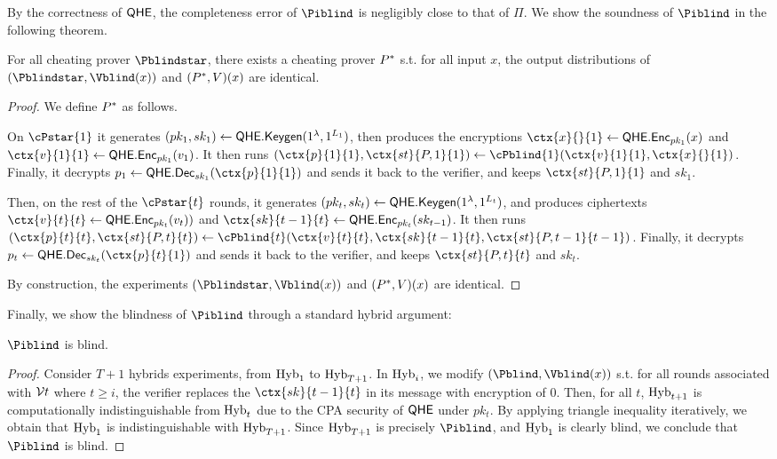By the correctness of $\mathsf{QHE}$, the completeness error of $\Piblind$ is negligibly close to that of $\Pi$.
We show the soundness of $\Piblind$ in the following theorem.

\begin{theorem}
	For all cheating prover $\Pblindstar$, there exists a cheating prover $P^*$ s.t. for all input $x$, the output distributions of $(\Pblindstar, \Vblind(x))$ and $(P^*, V)(x)$ are identical.
\end{theorem}
\begin{proof}
	We define $P^*$ as follows.
	
	On $\cPstar{1}$ it generates
	$(pk_1, sk_1)\leftarrow\mathsf{QHE.Keygen}(1^\lambda, 1^{L_1})$, then produces the encryptions
	$\ctx{x}{}{1}\leftarrow\QEnc_{pk_1}(x)$ and $\ctx{v}{1}{1}\leftarrow\QEnc_{pk_1}(v_1)$.
	It then runs $(\ctx{p}{1}{1}, \ctx{st}{P, 1}{1})\leftarrow\cPblind{1}(\ctx{v}{1}{1}, \ctx{x}{}{1})$.
	Finally, it decrypts $p_1\leftarrow\QDec_{sk_1}(\ctx{p}{1}{1})$ and sends it back to the verifier,
	and keeps $\ctx{st}{P, 1}{1}$ and $sk_1$.

	Then, on the rest of the $\cPstar{t}$ rounds, it generates
	$(pk_t, sk_t)\leftarrow\mathsf{QHE.Keygen}(1^\lambda, 1^{L_t})$, and produces ciphertexts
	$\ctx{v}{t}{t}\leftarrow\QEnc_{pk_t}(v_t))$ and $\ctx{sk}{t-1}{t}\leftarrow\QEnc_{pk_t}(sk_{t-1})$.
	It then runs $(\ctx{p}{t}{t}, \ctx{st}{P, t}{t})\leftarrow\cPblind{t}(\ctx{v}{t}{t}, \ctx{sk}{t-1}{t}, \ctx{st}{P, t-1}{t-1})$.
	Finally, it decrypts $p_t\leftarrow\QDec_{sk_t}(\ctx{p}{t}{1})$ and sends it back to the verifier,
	and keeps $\ctx{st}{P, t}{t}$ and $sk_t$.
		
	By construction, the experiments $(\Pblindstar, \Vblind(x))$ and $(P^*, V)(x)$ are identical.
\end{proof}

Finally, we show the blindness of $\Piblind$ through a standard hybrid argument:
\begin{theorem}
	$\Piblind$ is blind.
\end{theorem}
\begin{proof}
	Consider $T+1$ hybrids experiments, from $\operatorname{Hyb}_1$ to $\operatorname{Hyb}_{T+1}$.
	In $\operatorname{Hyb}_i$, we modify $(\Pblind, \Vblind(x))$ s.t.
	for all rounds associated with $\mathcal{V}{t}$ where $t\geq i$, the verifier replaces the $\ctx{sk}{t-1}{t}$ in its message with encryption of $0$.
	Then, for all $t$, $\operatorname{Hyb}_{t+1}$ is computationally indistinguishable from $\operatorname{Hyb}_t$ due to the CPA security of $\mathsf{QHE}$ under $pk_t$.
	By applying triangle inequality iteratively, we obtain that $\operatorname{Hyb}_1$ is indistinguishable with $\operatorname{Hyb}_{T+1}$.
	Since $\operatorname{Hyb}_{T+1}$ is precisely $\Piblind$, and $\operatorname{Hyb}_1$ is clearly blind, we conclude that $\Piblind$ is blind.
\end{proof}
